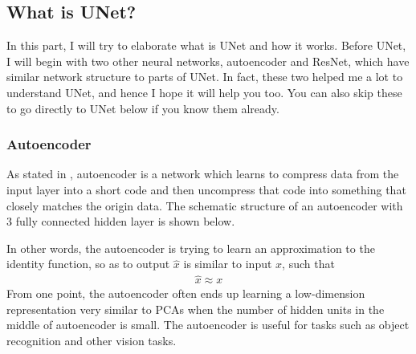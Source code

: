 \documentclass[letterpaper,10pt,english]{sphinxmanual}
\let\sphinxpxdimen\pdfpxdimen\else\newdimen\sphinxpxdimen
\begin{document}
\subsection{What is UNet?}
\label{\detokenize{usage/quickstart:what-is-unet}}
In this part, I will try to elaborate what is UNet and how it works. Before UNet, I will begin with two other neural networks, autoencoder and ResNet, which have similar network structure to parts of UNet. In fact, these two helped me a lot to understand UNet, and hence I hope it will help you too. You can also skip these to go directly to UNet below if you know them already.


\subsubsection{Autoencoder}
\label{\detokenize{usage/quickstart:autoencoder}}
As stated in , autoencoder is a network which learns to compress data from the input layer into a short code and then uncompress that code into something that closely matches the origin data. The schematic structure of an autoencoder with 3 fully connected hidden layer is shown below.

\noindent{\hspace*{\fill}\sphinxincludegraphics[width=300\sphinxpxdimen]{{Autoencoder_structure}.png}\hspace*{\fill}}

In other words, the autoencoder is trying to learn an approximation to the identity function, so as to output \(\hat{x}\) is similar to input \(x\), such that
\begin{equation*}
\begin{split}\hat{x} \approx x\end{split}
\end{equation*}
From one point, the autoencoder often ends up learning a low-dimension representation very similar to PCAs when the number of hidden units in the middle of autoencoder is small. The autoencoder is useful for tasks such as object recognition and other vision tasks.
\end{document}

